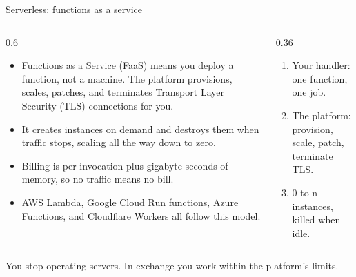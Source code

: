 \documentclass[10pt,aspectratio=169,t]{beamer}
\begin{document}
\begin{frame}[eyebrow=Serverless]{Serverless: functions as a service}
  \begin{columns}[T]
    \begin{column}{0.6\textwidth}
      \begin{itemize}
        \item Functions as a Service (FaaS) means you deploy a function, not a machine. The platform provisions, scales, patches, and terminates Transport Layer Security (TLS) connections for you.
        \item It creates instances on demand and destroys them when traffic stops, scaling all the way down to zero.
        \item Billing is per invocation plus gigabyte-seconds of memory, so no traffic means no bill.
        \item AWS Lambda, Google Cloud Run functions, Azure Functions, and Cloudflare Workers all follow this model.
      \end{itemize}
    \end{column}
    \begin{column}{0.36\textwidth}
      \begin{enumerate}
        \item Your handler: one function, one job.
        \item The platform: provision, scale, patch, terminate TLS.
        \item 0 to n instances, killed when idle.
      \end{enumerate}
    \end{column}
  \end{columns}
  \begin{takeaway}{You stop operating servers.}
    In exchange you work within the platform's limits.
  \end{takeaway}
\end{frame}
\end{document}
